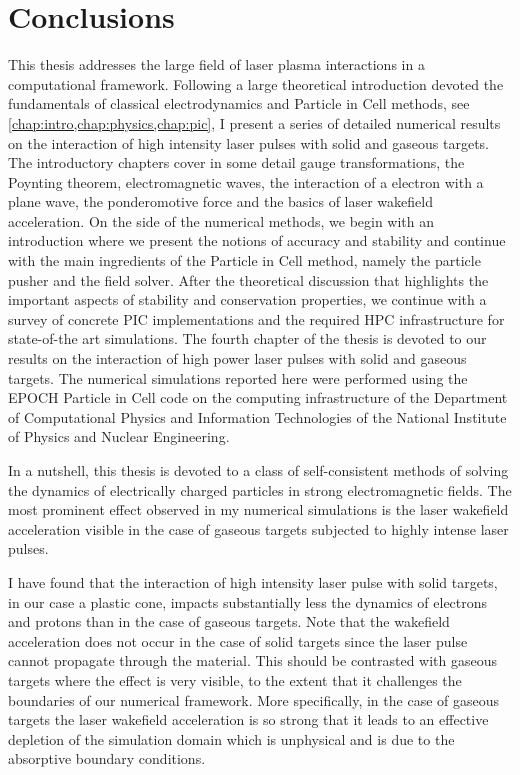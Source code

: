 \documentclass[12pt, class=report, crop=false]{standalone}
\begin{document}
\chapter{Conclusions}

This thesis addresses the large field of laser plasma interactions in a
computational framework. Following a large theoretical introduction devoted
the fundamentals of classical electrodynamics and Particle in Cell methods, see
\cref{chap:intro,chap:physics,chap:pic}, I present a series of detailed numerical
results on the interaction of high intensity laser pulses with solid and
gaseous targets. The introductory chapters cover in some detail gauge
transformations, the Poynting theorem, electromagnetic waves, the interaction
of a electron with a plane wave, the ponderomotive force and the basics of
laser wakefield acceleration. On the side of the numerical methods, we begin with
an introduction where we present the notions of accuracy and stability and
continue with the main ingredients of the Particle in Cell method, namely the
particle pusher and the field solver. After the theoretical discussion that
highlights the important aspects of stability and conservation properties, we
continue with a survey of concrete PIC implementations and the required HPC
infrastructure for state-of-the art simulations. The fourth chapter of the thesis
is devoted to our results on the interaction of high power laser pulses with
solid and gaseous targets. The numerical simulations reported here were performed
using the EPOCH Particle in Cell code on the computing infrastructure of the
Department of Computational Physics and Information
Technologies of the National Institute of Physics and Nuclear Engineering.

In a nutshell, this thesis is devoted to a class of self-consistent methods of
solving the dynamics of electrically charged particles in strong electromagnetic
fields. The most prominent effect observed in my numerical simulations is the
laser wakefield acceleration visible in the case of gaseous targets subjected
to highly intense laser pulses.

I have found that the interaction of high intensity laser pulse with solid targets,
in our case a plastic cone, impacts substantially less the dynamics of
electrons and protons than in the case of gaseous targets. Note that the
wakefield acceleration does not occur in the case of solid targets since the
laser pulse cannot propagate through the material. This should be contrasted
with gaseous targets where the effect is very visible, to the extent that
it challenges the boundaries of our numerical framework. More specifically,
in the case of gaseous targets the laser wakefield acceleration is so
strong that it leads to an effective depletion of the simulation domain
which is unphysical and is due to the absorptive boundary conditions.
\end{document}
